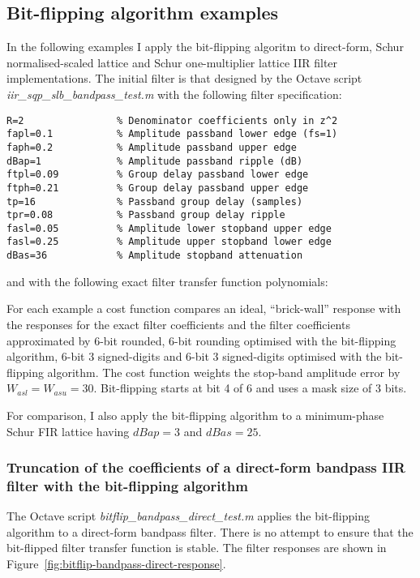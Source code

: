 \documentclass[a4paper,twoside,10pt,english]{report}
\begin{document}
\subsection{Bit-flipping algorithm examples}
In the following examples I apply the bit-flipping algoritm to direct-form,
Schur normalised-scaled lattice and Schur one-multiplier lattice IIR filter 
implementations. The initial filter is that designed by the Octave script
\emph{iir\_sqp\_slb\_bandpass\_test.m} with the following filter specification:
\begin{small}
\begin{verbatim}
R=2                % Denominator coefficients only in z^2 
fapl=0.1           % Amplitude passband lower edge (fs=1)
faph=0.2           % Amplitude passband upper edge
dBap=1             % Amplitude passband ripple (dB)
ftpl=0.09          % Group delay passband lower edge
ftph=0.21          % Group delay passband upper edge
tp=16              % Passband group delay (samples)
tpr=0.08           % Passband group delay ripple
fasl=0.05          % Amplitude lower stopband upper edge
fasl=0.25          % Amplitude upper stopband lower edge
dBas=36            % Amplitude stopband attenuation
\end{verbatim}
\end{small}

and with the following exact filter transfer function polynomials:
\begin{small}


\end{small}

For each example a cost function compares an ideal, ``brick-wall'' response 
with the responses for the exact filter coefficients and the filter coefficients 
approximated by 6-bit rounded, 6-bit rounding optimised with the
bit-flipping algorithm, 6-bit 3 signed-digits and 6-bit 3 signed-digits 
optimised with the bit-flipping algorithm. The cost function weights the 
stop-band amplitude error by $W_{asl}=W_{asu}=30$. Bit-flipping starts at bit
4 of 6 and uses a mask size of 3 bits. 

For comparison, I also apply the bit-flipping algorithm to a minimum-phase
Schur FIR lattice having $dBap=3$ and $dBas=25$.
\subsubsection{Truncation of the coefficients of a direct-form bandpass IIR filter with the bit-flipping algorithm}
The Octave script \emph{bitflip\_bandpass\_direct\_test.m} applies the
bit-flipping algorithm to a direct-form bandpass filter. There is no attempt to
ensure that the bit-flipped filter transfer function is stable. The filter 
responses are shown in Figure~\ref{fig:bitflip-bandpass-direct-response}.
\end{document}

